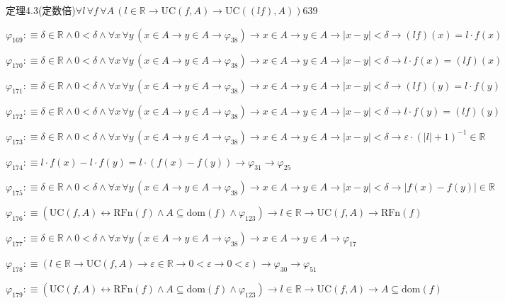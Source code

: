 \begin{fullproof}{定理4.3(定数倍)}{$\forall l\,\forall f\,\forall A\,(l \in \mathbb{R} \to \mathrm{UC}(f,A) \to \mathrm{UC}((l f),A))$}{639}
\begin{abbrevlist}
\item $\varphi_{169} :\equiv \delta \in \mathbb{R} \land 0 < \delta \land \forall x\,\forall y\,(x \in A \to y \in A \to \varphi_{38}) \to x \in A \to y \in A \to \lvert x - y \rvert < \delta \to (l f)(x) = l \cdot f(x)$
\item $\varphi_{170} :\equiv \delta \in \mathbb{R} \land 0 < \delta \land \forall x\,\forall y\,(x \in A \to y \in A \to \varphi_{38}) \to x \in A \to y \in A \to \lvert x - y \rvert < \delta \to l \cdot f(x) = (l f)(x)$
\item $\varphi_{171} :\equiv \delta \in \mathbb{R} \land 0 < \delta \land \forall x\,\forall y\,(x \in A \to y \in A \to \varphi_{38}) \to x \in A \to y \in A \to \lvert x - y \rvert < \delta \to (l f)(y) = l \cdot f(y)$
\item $\varphi_{172} :\equiv \delta \in \mathbb{R} \land 0 < \delta \land \forall x\,\forall y\,(x \in A \to y \in A \to \varphi_{38}) \to x \in A \to y \in A \to \lvert x - y \rvert < \delta \to l \cdot f(y) = (l f)(y)$
\item $\varphi_{173} :\equiv \delta \in \mathbb{R} \land 0 < \delta \land \forall x\,\forall y\,(x \in A \to y \in A \to \varphi_{38}) \to x \in A \to y \in A \to \lvert x - y \rvert < \delta \to \varepsilon \cdot (\lvert l \rvert + 1)^{-1} \in \mathbb{R}$
\item $\varphi_{174} :\equiv l \cdot f(x) - l \cdot f(y) = l \cdot (f(x) - f(y)) \to \varphi_{31} \to \varphi_{25}$
\item $\varphi_{175} :\equiv \delta \in \mathbb{R} \land 0 < \delta \land \forall x\,\forall y\,(x \in A \to y \in A \to \varphi_{38}) \to x \in A \to y \in A \to \lvert x - y \rvert < \delta \to \lvert f(x) - f(y) \rvert \in \mathbb{R}$
\item $\varphi_{176} :\equiv (\mathrm{UC}(f,A) \leftrightarrow \mathrm{RFn}(f) \land A \subseteq \mathrm{dom}(f) \land \varphi_{123}) \to l \in \mathbb{R} \to \mathrm{UC}(f,A) \to \mathrm{RFn}(f)$
\item $\varphi_{177} :\equiv \delta \in \mathbb{R} \land 0 < \delta \land \forall x\,\forall y\,(x \in A \to y \in A \to \varphi_{38}) \to x \in A \to y \in A \to \varphi_{17}$
\item $\varphi_{178} :\equiv (l \in \mathbb{R} \to \mathrm{UC}(f,A) \to \varepsilon \in \mathbb{R} \to 0 < \varepsilon \to 0 < \varepsilon) \to \varphi_{30} \to \varphi_{51}$
\item $\varphi_{179} :\equiv (\mathrm{UC}(f,A) \leftrightarrow \mathrm{RFn}(f) \land A \subseteq \mathrm{dom}(f) \land \varphi_{123}) \to l \in \mathbb{R} \to \mathrm{UC}(f,A) \to A \subseteq \mathrm{dom}(f)$

\end{abbrevlist}
\end{fullproof}
